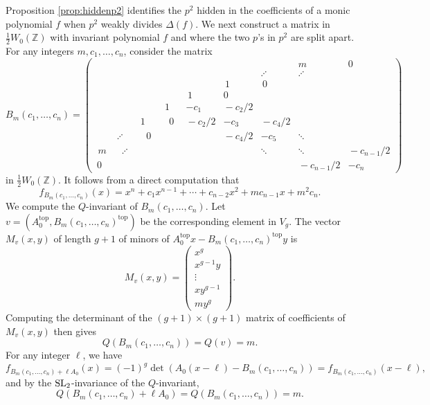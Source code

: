 \documentclass[11pt]{article}
\def\Z{{\mathbb Z}}
\def\SL{{\rm SL}}
\def\Z{{\mathbb Z}}
\def\sub{{\textrm{top}}}
\begin{document}
Proposition \ref{prop:hiddenp2} identifies the $p^2$ hidden in the
coefficients of a monic polynomial $f$ when $p^2$ weakly divides
$\Delta(f)$. We next construct a matrix in $\frac12 W_0(\Z)$ with
invariant polynomial $f$ and where the two $p$'s in $p^2$ are split
apart.  For any integers $m,c_1,\ldots,c_n$, consider the matrix
\begin{equation}\label{mat1}
 B_m(c_1,\ldots,c_n) =
 \left(\!\begin{array}{ccccccccc}&&&&&&&m&\!0\\[.1in]&&&&&&\iddots&\iddots& \\[.15in]&&&&&\,1\,&\,0\,&&\\[.125in] &&&&\,1\,&0&&&\\[.125in] &&&1&-c_1&\!\!-c_2/2\!\!&&& \\[.15in] &&1&\;\,0\;\,&\!\!-c_2/2\!\!&-c_3&\!\!-c_4/2\!\!&&\\[.045in]&\iddots&\;\,\,0\;\,\,&&&\!\!-c_4/2\!\!&-c_5&\ddots&\\[.025in] \;m\;&\,\,\,\iddots\,\,\,&&&&&\ddots&\ddots&\!\!\!-c_{n-1}/2\!\!\!
   \\[.105in] \,0\,&&&&&&&\!\!\!-c_{n-1}/2\!\!\!&-c_n \end{array}\right)
\end{equation}
in $\frac12 W_0(\Z)$. It follows from a direct computation that
$$f_{B_m(c_1,\ldots,c_n)}(x) = x^n + c_1x^{n-1} + \cdots + c_{n-2}x^2
+ mc_{n-1}x + m^2c_n.$$ We compute the $Q$-invariant of $B_m(c_1,\ldots,c_n)$. Let $v = (A_0^\sub, B_m(c_1,\ldots,c_n)^\sub)$ be the corresponding element in $V_g$. The vector $M_v(x,y)$ of length $g+1$ of minors of $A_0^\sub x-B_m(c_1,\ldots,c_n)^\sub y$ is
$$M_v(x,y) = \begin{pmatrix} x^g\\ x^{g-1}y\\ \vdots \\ xy^{g-1}\\ my^g\end{pmatrix}.$$
Computing the determinant of the $(g+1)\times(g+1)$ matrix of coefficients of $M_v(x,y)$ then gives
$$Q(B_m(c_1,\ldots,c_n)) = Q(v) = m.$$
For any integer $\ell$, we have
\begin{equation}\label{eq:ell}
f_{B_m(c_1,\ldots,c_n) + \ell A_0}(x) = (-1)^g\det(A_0(x-\ell)-B_m(c_1,\ldots,c_n)) = f_{B_m(c_1,\ldots,c_n)}(x - \ell),
\end{equation}
and by the $\SL_2$-invariance of the $Q$-invariant,
\begin{equation}\label{eq:ellQ}
Q(B_m(c_1,\ldots,c_n) + \ell A_0) = Q(B_m(c_1,\ldots,c_n)) = m.
\end{equation}
\end{document}
